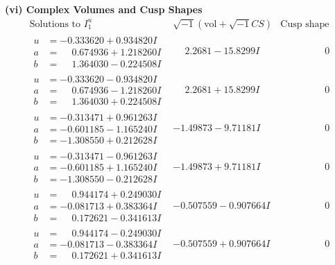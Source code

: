 \documentclass[1p]{elsarticle_modified}
\theoremstyle{definition}
\newcommand{\I}{\sqrt{-1}}
\begin{document}
\newpage\flushleft \textbf{(vi) Complex Volumes and Cusp Shapes}
$$\begin{array}{c|c|c}  
\text{Solutions to }I^u_{1}& \I (\text{vol} + \sqrt{-1}CS) & \text{Cusp shape}\\
 \hline 
\begin{aligned}
u &= -0.333620 + 0.934820 I \\
a &= \phantom{-}0.674936 + 1.218260 I \\
b &= \phantom{-}1.364030 - 0.224508 I\end{aligned}
 & \phantom{-}2.2681 - 15.8299 I & \phantom{-0.000000 } 0 \\ \hline\begin{aligned}
u &= -0.333620 - 0.934820 I \\
a &= \phantom{-}0.674936 - 1.218260 I \\
b &= \phantom{-}1.364030 + 0.224508 I\end{aligned}
 & \phantom{-}2.2681 + 15.8299 I & \phantom{-0.000000 } 0 \\ \hline\begin{aligned}
u &= -0.313471 + 0.961263 I \\
a &= -0.601185 - 1.165240 I \\
b &= -1.308550 + 0.212628 I\end{aligned}
 & -1.49873 - 9.71181 I & \phantom{-0.000000 } 0 \\ \hline\begin{aligned}
u &= -0.313471 - 0.961263 I \\
a &= -0.601185 + 1.165240 I \\
b &= -1.308550 - 0.212628 I\end{aligned}
 & -1.49873 + 9.71181 I & \phantom{-0.000000 } 0 \\ \hline\begin{aligned}
u &= \phantom{-}0.944174 + 0.249030 I \\
a &= -0.081713 + 0.383364 I \\
b &= \phantom{-}0.172621 - 0.341613 I\end{aligned}
 & -0.507559 - 0.907664 I & \phantom{-0.000000 } 0 \\ \hline\begin{aligned}
u &= \phantom{-}0.944174 - 0.249030 I \\
a &= -0.081713 - 0.383364 I \\
b &= \phantom{-}0.172621 + 0.341613 I\end{aligned}
 & -0.507559 + 0.907664 I & \phantom{-0.000000 } 0 \\ \hline\begin{aligned}

\end{aligned}
\end{array}$$
\end{document}
